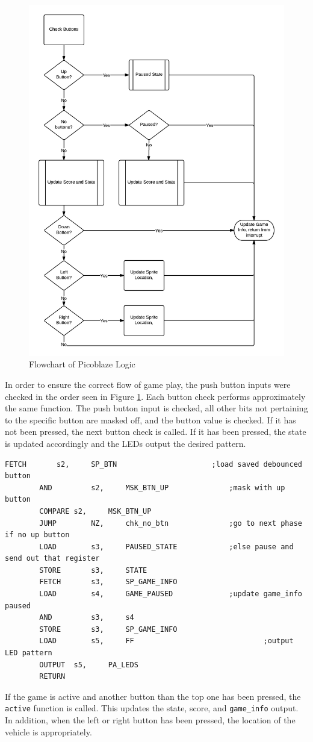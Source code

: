 \documentclass[11pt]{article}
\begin{document}
		\begin{figure}[h!]\centering
		  \includegraphics[width=.8\textwidth]{Images/game_logic.png}
		  \caption{Flowchart of Picoblaze Logic}
		  \label{game_logic}
		\end{figure}	


In order to ensure the correct flow of game play, the push button inputs were checked in the order seen in Figure \ref{game_logic}.  Each button check performs approximately the same function.  The push button input is checked, all other bits not pertaining to the specific button are masked off, and the button value is checked.  If it has not been pressed, the next button check is called.  If it has been pressed, the state is updated accordingly and the LEDs output the desired pattern. 
\vspace{12pt}
\begin{lstlisting}[caption=Function checking if the top button has been pushed, label=chk_up_btn]		
		FETCH		s2,		SP_BTN						;load saved debounced button
		AND			s2,		MSK_BTN_UP				;mask with up button
		COMPARE	s2,		MSK_BTN_UP
		JUMP 		NZ, 	chk_no_btn				;go to next phase if no up button
		LOAD 		s3,		PAUSED_STATE			;else pause and send out that register
		STORE		s3,		STATE
		FETCH		s3,		SP_GAME_INFO
		LOAD 		s4,		GAME_PAUSED 			;update game_info paused	
		AND			s3,		s4						
		STORE		s3,		SP_GAME_INFO
		LOAD		s5,		FF								;output LED pattern
		OUTPUT	s5,		PA_LEDS
		RETURN	
 \end{lstlisting}
\vspace{12pt}
\hspace{16pt}If the game is active and another button than the top one has been pressed, the \texttt{active} function is called.  This updates the state, score, and \texttt{game\_info} output.  In addition, when the left or right button has been pressed, the location of the vehicle is appropriately.\\
\end{document}

